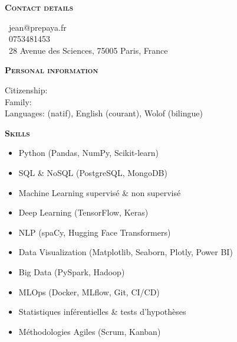 \documentclass[11pt,a4paper]{article}
\newcommand{\headleft}[1]{\vspace*{3ex}\textsc{\textbf{#1}}\par%
    \vspace*{-1.5ex}\hrulefill\par\vspace*{0.7ex}}
\begin{document}
\begin{minipage}[t]{0.33\textwidth}
{\begin{minipage}[t][293mm][t]{0.82\textwidth}
\headleft{Contact details}\small
\MVAt\ {\small jean@prepaya.fr} \\[0.4ex]
\Mobilefone\ 0753481453 \\[0.5ex]
\Letter\ 28 Avenue des Sciences, 75005 Paris, France
\normalsize

\headleft{Personal information}
Citizenship:  \\[0.5ex]
Family:  \\[0.5ex]
Languages:  (natif), English (courant), Wolof (bilingue)

\headleft{Skills}
\begin{itemize}

  \item Python (Pandas, NumPy, Scikit-learn)

  \item SQL & NoSQL (PostgreSQL, MongoDB)

  \item Machine Learning supervisé & non supervisé

  \item Deep Learning (TensorFlow, Keras)

  \item NLP (spaCy, Hugging Face Transformers)

  \item Data Visualization (Matplotlib, Seaborn, Plotly, Power BI)

  \item Big Data (PySpark, Hadoop)

  \item MLOps (Docker, MLflow, Git, CI/CD)

  \item Statistiques inférentielles & tests d’hypothèses

  \item Méthodologies Agiles (Scrum, Kanban)

\end{itemize}

\end{minipage}\textwidth
}
\end{minipage}
\end{document}
